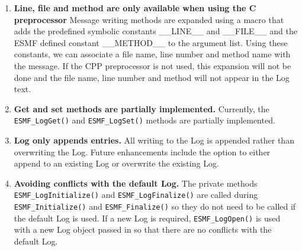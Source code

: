 %

\begin{enumerate}

\item {\bf Line, file and method are only available when using the C 
preprocessor}
Message writing methods are expanded using a macro that adds the predefined 
symbolic constants \_\_LINE\_\_ and \_\_FILE\_\_ and the ESMF defined constant
\_\_METHOD\_\_ to the argument list.  Using these constants, we can associate 
a file name, line number and method name with the message.  If the CPP 
preprocessor is not used, this expansion will not be done and the file name,
line number and method will not appear in the Log text.

\item{\bf Get and set methods are partially implemented.}
Currently, the {\tt ESMF\_LogGet()} and {\tt ESMF\_LogSet()} methods are 
partially implemented.   

\item{\bf Log only appends entries.}
All writing to the Log is appended rather than overwriting the Log.  Future 
enhancements include the option to either append to an existing Log or 
overwrite the existing Log.

\item{\bf Avoiding conflicts with the default Log.}
The private methods {\tt ESMF\_LogInitialize()} and {\tt ESMF\_LogFinalize()} 
are called during {\tt ESMF\_Initialize()} and {\tt ESMF\_Finalize()} so they
do not need to be called if the default Log is used.  If a new Log is required,
{\tt ESMF\_LogOpen()} is used with a new Log object passed in so that there 
are no conflicts with the default Log.

\end{enumerate}
